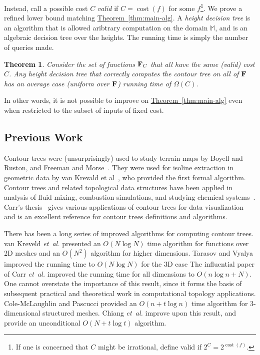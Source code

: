 \documentclass[11pt]{article}
\newtheorem{theorem}{Theorem}
\theoremstyle{definition}
\newcommand{\bF}{{\bf F}}
\newcommand{\MM}{\mathbb{M}}
\newcommand{\Thm}[1]{\hyperref[thm:#1]{Theorem~\ref*{thm:#1}}} %
\newcommand{\etal}{\textit{et~al.}\xspace}
\newcommand{\cost}{\mathop{cost}}
\begin{document}
Instead, call a possible cost $C$ \emph{valid} if $C = \cost(f)$ for some $f$\footnote{If one is concerned
that $C$ might be irrational, define valid if $2^C = 2^{\cost(f)}$.}. We prove
a refined lower bound matching \Thm{main-alg}. A \emph{height decision tree} is an algorithm
that is allowed aribtrary computation on the domain $\MM$, and is an algebraic decision
tree over the heights. The running time is simply the number of queries made.

\begin{theorem} \label{thm:main-lb} Consider the set of functions $\bF_C$ that all have the same (valid) cost $C$.
Any height decision tree that correctly computes
the contour tree on all of $\bF$ has an average case (uniform over $\bF$) running time of $\Omega(C)$.
\end{theorem}

In other words, it is not possible to improve on \Thm{main-alg} even when restricted to the subset
of inputs of fixed cost.


\subsection{Previous Work}

Contour trees were (unsurprisingly) used to study terrain maps by Boyell and Ruston, and Freeman and Morse~\cite{BoRu63,FrMo67}.
They were used for isoline extraction in geometric data by van Krevald et al~\cite{kobps-ctsssit-97}, who provided
the first formal algorithm. 
Contour trees and related topological data structures have been applied in analysis of fluid mixing, combustion simulations,
and studying chemical systems~\cite{LaBe+06,BrWe+10,BeWe+11,BrWe+11,MaGr+11}. Carr's thesis~\cite{c-tmi-04} gives various
applications of contour trees for data visualization and is an excellent reference for contour trees definitions and algorithms.

There has been a long series of improved algorithms for computing contour trees.
van Kreveld \etal \cite{kobps-ctsssit-97} presented an $O(N\log N)$ time algorithm for functions over 2D 
meshes and an $O(N^2)$ algorithm for higher dimensions. 
Tarasov and Vyalya \cite{tv-cct-98} improved the running time to $O(N\log N)$ for the 3D case
The influential paper of Carr \etal \cite{csa-cctad-00} improved the running time for all dimensions to $O(n\log n + N)$.
One cannot overstate the importance of this result, since it forms the basis 
of subsequent practical and theoretical work in computational topology applications. 
Cole-McLaughlin and Pascucci \cite{pc-ectls-02} provided an $O(n+t\log n)$ time algorithm for 
$3$-dimensional structured meshes. Chiang \etal \cite{cllr-sooscctmp-05} improve upon this result, and provide an unconditional $O(N+t\log t)$ algorithm.
\end{document}
